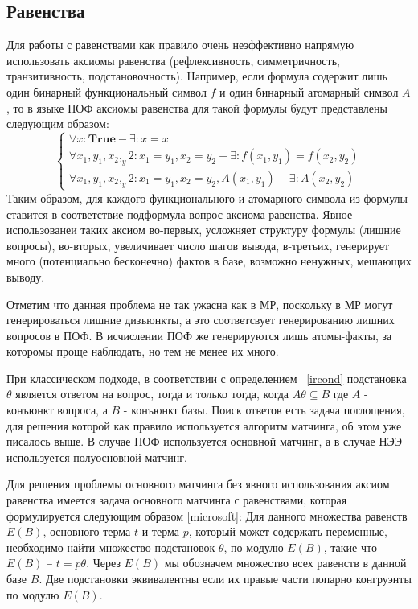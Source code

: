 \subsection{Равенства}
Для работы с равенствами как правило очень неэффективно напрямую использовать аксиомы равенства (рефлексивность, симметричность, транзитивность, подстановочность). Например, если формула содержит лишь один бинарный функциональный символ $f$ и один бинарный атомарный символ $A$, то в языке ПОФ аксиомы равенства для такой формулы будут представлены следующим образом: 
$$\left\lbrace
\begin{array}{l}
\forall x\colon\boldsymbol{True} - \exists\colon x = x \\
\forall x_1,y_1,x_2,_y2\colon x_1 = y_1, x_2 = y_2 - \exists\colon f(x_1,y_1) = f(x_2, y_2) \\
\forall x_1,y_1,x_2,_y2\colon x_1 = y_1, x_2 = y_2, A(x_1,y_1) - \exists\colon A(x_2,y_2)
\end{array}\right.
$$
Таким образом, для каждого функционального и атомарного символа из формулы ставится в соответствие подформула-вопрос аксиома равенства. Явное использованеи таких аксиом во-первых, усложняет структуру формулы (лишние вопросы), во-вторых, увеличивает число шагов вывода, в-третьих, генерирует много (потенциально бесконечно) фактов в базе, возможно ненужных, мешающих выводу. 

Отметим что данная проблема не так ужасна как в МР, поскольку в МР могут генерироваться лишние дизъюнкты, а это соответсвует генерированию лишних вопросов в ПОФ. В исчислении ПОФ же генерируются лишь атомы-факты, за которомы проще наблюдать, но тем не менее их много.

При классическом подходе, в соответствии с определением ~\ref{ircond} подстановка $\theta$ является ответом на вопрос, тогда и только тогда, когда $A \theta \subseteq B$ где $A$ - конъюнкт вопроса, а $B$ - конъюнкт базы. Поиск ответов есть задача поглощения, для решения которой как правило используется алгоритм матчинга, об этом уже писалось выше. В случае ПОФ используется основной матчинг, а в случае НЭЭ используется полуосновной-матчинг.
 
Для решения проблемы основного матчинга без явного использования аксиом равенства имеется задача основного матчинга с равенствами, которая формулируется следующим образом [microsoft]:
Для данного множества равенств $E(B)$, основного терма $t$ и терма $p$, который может содержать переменные, необходимо найти множество подстановок $\theta$, по модулю $E(B)$, такие что $E(B)\models t = p\theta$. Через $E(B)$ мы обозначем множество всех равенств в данной базе $B$. Две подстановки эквивалентны если их правые части попарно конгруэнты по модулю $E(B)$.

